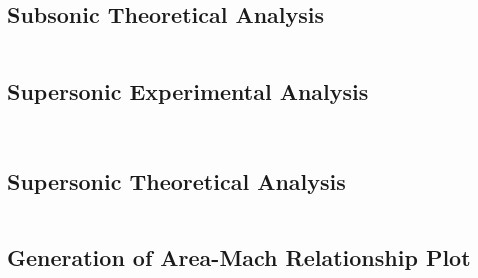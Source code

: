 \documentclass[runningheads]{llncs}
\begin{document}
\inputminted{matlab}{code/subsonic_experimental.m}
\inputminted{matlab}{code/subsonic_experimental_err.m}


\subsection{Subsonic Theoretical Analysis}

\inputminted{matlab}{code/subsonic_theoretical.m}

\subsection{Supersonic Experimental Analysis}

\inputminted{matlab}{code/supersonic_experimental.m}
\inputminted{matlab}{code/supersonic_experimental_err.m}

\subsection{Supersonic Theoretical Analysis}

\inputminted{matlab}{code/supersonic_theoretical.m}

\subsection{Generation of Area-Mach Relationship Plot}
\inputminted{matlab}{code/area_mach_relation_plot.m}
\end{document}

